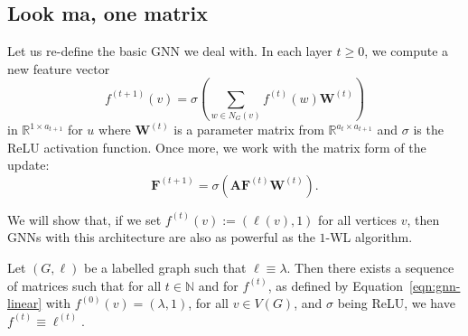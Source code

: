 \subsection{Look ma, one matrix}
Let us re-define the basic GNN we deal with. In each
layer $t \geq 0$, we compute a new feature vector
\[
    f^{(t+1)}(v) = \sigma\left(
        \sum_{w \in N_G(v)} f^{(t)}(w) \mathbf{W}^{(t)}
    \right)
\]
in $\mathbb{R}^{1 \times a_{t+1}}$ for $u$ where $\mathbf{W}^{(t)}$ is a
parameter matrix from $\mathbb{R}^{a_t \times a_{t+1}}$ and $\sigma$
is the ReLU activation function. Once more, we work with the matrix
form of the update:
\begin{equation}\label{eqn:gnn-linear}
    \mathbf{F}^{(t+1)} = \sigma\left(\mathbf{AF}^{(t)}\mathbf{W}^{(t)}\right).
\end{equation}

We will show that, if we set $f^{(t)}(v) := (\ell(v), 1)$ for all vertices
$v$, then GNNs with this architecture are also as
powerful as the $1$-WL algorithm.

\begin{proposition}
  Let $(G,\ell)$ be a labelled graph such that $\ell \equiv \lambda$. Then
  there exists a sequence of matrices such that for all $t \in \mathbb{N}$ and
  for $f^{(t)}$, as defined by Equation~\eqref{eqn:gnn-linear} with
  $f^{(0)}(v) = (\lambda, 1)$, for all $v \in V(G)$, and $\sigma$ being ReLU,
  we have $f^{(t)} \equiv \ell^{(t)}$.
\end{proposition}



